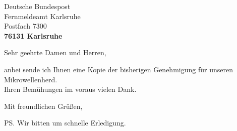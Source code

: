 \documentclass[12pt]{dinbrief}
\begin{document}

\begin{letter}{Deutsche Bundespost\\
Fernmeldeamt Karlsruhe\\
Postfach 7300\\[\medskipamount]
{\bf 76131 Karlsruhe}}

\subject{Betrieb eines Mikrowellensenders}

\opening{Sehr geehrte Damen und Herren,}

anbei sende ich Ihnen eine Kopie der bisherigen Genehmigung f\"ur
unseren Mikrowellenherd.\\
Ihren Bem\"uhungen im voraus vielen Dank.

\closing{Mit freundlichen Gr\"u\ss en,}

\ps{Wir bitten um schnelle Erledigung.}


\end{letter}
\end{document}
